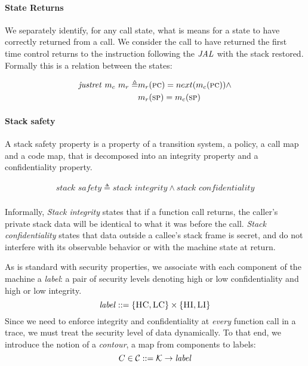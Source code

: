 \documentclass[acmsmall,review,anonymous]{acmart}\settopmatter{printfolios=true,printccs=false,printacmref=false}
\begin{document}
\paragraph*{State Returns}

  We separately identify, for any call state, what is means for a state to
  have correctly returned from a call. We consider the call to have returned
  the first time control returns to the instruction following the \(\mathit{JAL}\) with
  the stack restored. Formally this is a relation between the states:
    
  \[\begin{split}
    \mathit{justret}\ m_c\ m_r \triangleq & m_r(\textsc{pc}) =
    next(m_c(\textsc{pc})) \land \\
    & m_r(\textsc{sp}) = m_c(\textsc{sp})
  \end{split}\]


\paragraph*{Stack safety}
  
  A stack safety property is a property of a transition system, a policy, a
  call map and a code map, that is decomposed into an integrity property and a
  confidentiality property.

    \[\begin{split}
      \textit{stack safety} \triangleq \textit{stack integrity} \land
      \textit{stack confidentiality} \\
    \end{split}\]

   Informally, {\it Stack
  integrity} states that if a function call returns, the caller's
  private stack data will be identical to what it was before the
  call. {\it Stack confidentiality} states that data outside a callee's
  stack frame is secret, and do not interfere with its observable
  behavior or with the machine state at return.

  As is standard with security properties, we associate with each
  component of the machine a {\em label}: a pair of security levels
  denoting high or low confidentiality and high or low integrity.
  \[\mathit{label} ::= \{\textsc{HC},\textsc{LC}\} \times \{\textsc{HI},\textsc{LI}\}\]
  Since we need to enforce integrity and confidentiality at {\em every}
  function call in a trace, we must treat the security level of data
  dynamically. To that end, we introduce the notion of a {\em contour},
  a map from components to labels:
  \[C \in {\mathcal C} ::= {\mathcal K} \rightarrow \mathit{label}\]
\end{document}
